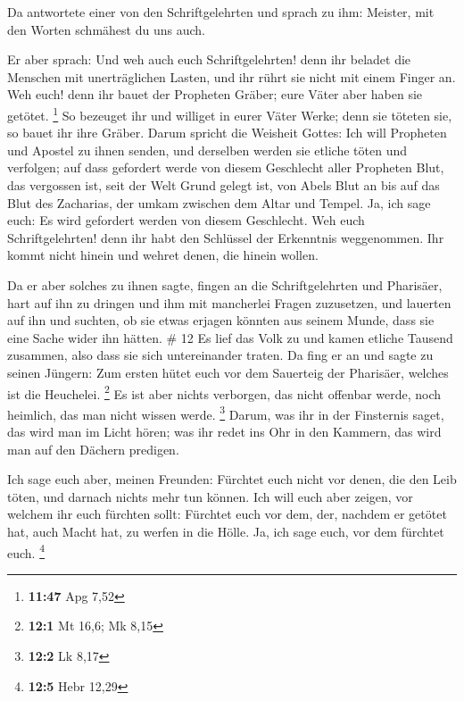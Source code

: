  Da antwortete einer von den Schriftgelehrten und sprach
zu ihm: Meister, mit den Worten schmähest du uns auch.

 Er aber sprach: Und weh auch euch Schriftgelehrten! denn
ihr beladet die Menschen mit unerträglichen Lasten, und ihr rührt sie
nicht mit einem Finger an.  Weh euch! denn ihr bauet der
Propheten Gräber; eure Väter aber haben sie getötet. \footnote{\textbf{11:47}
  Apg 7,52}  So bezeuget ihr und williget in eurer Väter
Werke; denn sie töteten sie, so bauet ihr ihre Gräber. 
Darum spricht die Weisheit Gottes: Ich will Propheten und Apostel zu
ihnen senden, und derselben werden sie etliche töten und verfolgen;
 auf dass gefordert werde von diesem Geschlecht aller
Propheten Blut, das vergossen ist, seit der Welt Grund gelegt ist,
 von Abels Blut an bis auf das Blut des Zacharias, der
umkam zwischen dem Altar und Tempel. Ja, ich sage euch: Es wird
gefordert werden von diesem Geschlecht.  Weh euch
Schriftgelehrten! denn ihr habt den Schlüssel der Erkenntnis
weggenommen. Ihr kommt nicht hinein und wehret denen, die hinein wollen.

 Da er aber solches zu ihnen sagte, fingen an die
Schriftgelehrten und Pharisäer, hart auf ihn zu dringen und ihm mit
mancherlei Fragen zuzusetzen,  und lauerten auf ihn und
suchten, ob sie etwas erjagen könnten aus seinem Munde, dass sie eine
Sache wider ihn hätten. \# 12  Es lief das Volk zu und
kamen etliche Tausend zusammen, also dass sie sich untereinander traten.
Da fing er an und sagte zu seinen Jüngern: Zum ersten hütet euch vor dem
Sauerteig der Pharisäer, welches ist die Heuchelei. \footnote{\textbf{12:1}
  Mt 16,6; Mk 8,15}  Es ist aber nichts verborgen, das
nicht offenbar werde, noch heimlich, das man nicht wissen werde.
\footnote{\textbf{12:2} Lk 8,17}  Darum, was ihr in der
Finsternis saget, das wird man im Licht hören; was ihr redet ins Ohr in
den Kammern, das wird man auf den Dächern predigen.

 Ich sage euch aber, meinen Freunden: Fürchtet euch nicht
vor denen, die den Leib töten, und darnach nichts mehr tun können.
 Ich will euch aber zeigen, vor welchem ihr euch fürchten
sollt: Fürchtet euch vor dem, der, nachdem er getötet hat, auch Macht
hat, zu werfen in die Hölle. Ja, ich sage euch, vor dem fürchtet euch.
\footnote{\textbf{12:5} Hebr 12,29}

